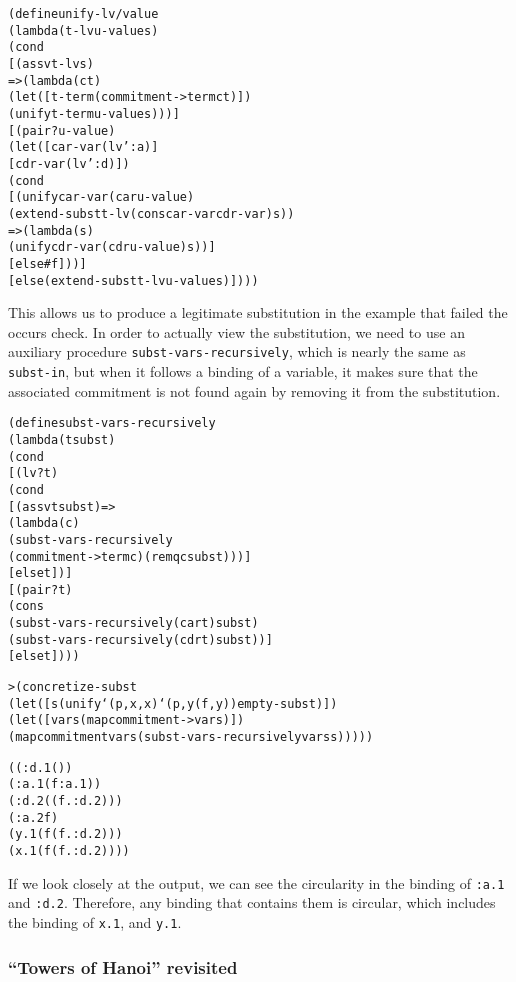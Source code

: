 \begin{alltt}
(define unify-lv/value
  (lambda (t-lv u-value s)
    (cond
      [(assv t-lv s)
       => (lambda (ct)
            (let ([t-term (commitment->term ct)]) 
              (unify t-term u-value s)))]
      [(pair? u-value)
       (let ([car-var (lv ':a)]
             [cdr-var (lv ':d)])
         (cond
           [(unify car-var (car u-value)
              (extend-subst t-lv (cons car-var cdr-var) s))
            => (lambda (s)
                 (unify cdr-var (cdr u-value) s))]
           [else #f]))]
      [else (extend-subst t-lv u-value s)])))
\end{alltt}
This allows us to produce a legitimate substitution in the example
that failed the occurs check.  In order to actually view the
substitution, we need to use an auxiliary procedure
\texttt{subst-vars-recursively}, which is nearly the same as
\texttt{subst-in}, but when it follows a binding of a variable, it
makes sure that the associated commitment is not found again by
removing it from the substitution.

\begin{alltt}
(define subst-vars-recursively
  (lambda (t subst)
    (cond
      [(lv? t)
       (cond
         [(assv t subst) =>
          (lambda (c)
            (subst-vars-recursively
              (commitment->term c) (remq c subst)))]
         [else t])]
      [(pair? t)
       (cons
         (subst-vars-recursively (car t) subst)
         (subst-vars-recursively (cdr t) subst))]
      [else t])))

> (concretize-subst
    (let ([s (unify `(p ,x ,x) `(p ,y (f ,y)) empty-subst)])
      (let ([vars (map commitment->var s)])
        (map commitment vars (subst-vars-recursively vars s)))))

((:d.1 ())
 (:a.1 (f :a.1))
 (:d.2 ((f . :d.2)))
 (:a.2 f)
 (y.1 (f (f . :d.2)))
 (x.1 (f (f . :d.2))))
\end{alltt}

If we look closely at the output, we can see the circularity in the
binding of \texttt{:a.1} and \texttt{:d.2}.  Therefore, any binding
that contains them is circular, which includes the binding of 
\texttt{x.1}, and \texttt{y.1}.

\subsubsection{``Towers of Hanoi'' revisited}


